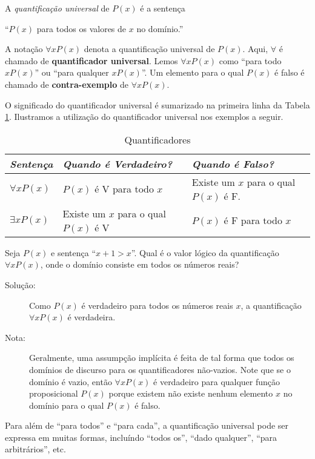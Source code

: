 \begin{defn}
\label{def19}
A \emph{quantificação universal} de $P(x)$ é a sentença
\begin{center}``$P(x)$ para todos os valores de $x$ no domínio.''\end{center}
A notação $\forall xP(x)$ denota a quantificação universal de $P(x)$. Aqui,
$\forall$ é chamado de \textbf{quantificador universal}. Lemos $\forall xP(x)$
como ``para todo $xP(x)$'' ou ``para qualquer $xP(x)$''. Um elemento para o qual
$P(x)$ é falso é chamado de \textbf{contra-exemplo} de $\forall xP(x)$.
\end{defn}

O significado do quantificador universal é sumarizado na primeira linha da
Tabela \ref{tab127}. Ilustramos a utilização do quantificador universal nos
exemplos a seguir.

\begin{table}[H]
\centering
\begin{tabular}{|l|l|l|}%
\toprule
\textbf{\emph{Sentença}} & \textbf{\emph{Quando é Verdadeiro?}} &
\textbf{\emph{Quando é Falso?}}\\
\midrule
$\forall xP(x)$ & $P(x)$ é V para todo $x$	& Existe um $x$ para o
qual $P(x)$ é F.\\
$\exists xP(x)$ & Existe um $x$ para o qual $P(x)$ é V & $P(x)$ é F
para todo $x$\\
\bottomrule%
\end{tabular}%
\caption{Quantificadores}
\label{tab127}
\end{table}

\begin{exmp}
\label{exem133}
Seja $P(x)$ e sentença ``$x + 1>x$''. Qual é o valor lógico da quantificação
$\forall xP(x)$, onde o domínio consiste em todos os números reais?
\end{exmp}
\begin{description}
\item[Solução:] Como $P(x)$ é verdadeiro para todos os números reais $x$, a
quantificação $\forall xP(x)$ é verdadeira.
\item[Nota:] Geralmente, uma assumpção implícita é feita de tal forma que todos
os domínios de discurso para os quantificadores não-vazios. Note que se o
domínio é vazio, então $\forall xP(x)$ é verdadeiro para qualquer função
proposicional $P(x)$ porque existem não existe nenhum elemento $x$ no domínio
para o qual $P(x)$ é falso.
\end{description}

Para além de ``para todos'' e ``para cada'', a quantificação universal pode ser
expressa em muitas formas, incluíndo ``todos os'', ``dado qualquer'', ``para
arbitrários'', etc.

